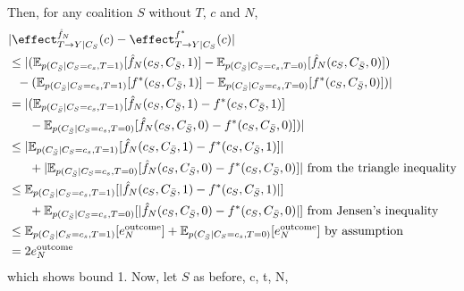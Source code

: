 Then, for any coalition $S$ without $T$, $c$ and $N$,
\begin{align*}
&| \effect^{\hat{f}_N}_{ T \rightarrow Y | C_S}(c) - \effect^{f^*}_{ T \rightarrow Y | C_S}(c)| \\
&\leq |(\mathbb{E}_{p(C_{\bar{S}}|C_S=c_s,T=1)}[\hat{f}_N(c_S,C_{\bar{S}},1)] - \mathbb{E}_{p(C_{\bar{S}}|C_S=c_s,T=0)}[\hat{f}_N(c_S,C_{\bar{S}},0)]) \\
& \ \ - (\mathbb{E}_{p(C_{\bar{S}}|C_S=c_s,T=1)}[f^*(c_S,C_{\bar{S}},1)] - \mathbb{E}_{p(C_{\bar{S}}|C_S=c_s,T=0)}[f^*(c_S,C_{\bar{S}},0)])| \\
&= |(\mathbb{E}_{p(C_{\bar{S}}|C_S=c_s,T=1)}[\hat{f}_N(c_S,C_{\bar{S}},1) - f^*(c_S,C_{\bar{S}},1)] \\
& \ \ \ \ \  - \mathbb{E}_{p(C_{\bar{S}}|C_S=c_s,T=0)}[\hat{f}_N(c_S,C_{\bar{S}},0) - f^*(c_S,C_{\bar{S}},0)])| \\
&\leq |\mathbb{E}_{p(C_{\bar{S}}|C_S=c_s,T=1)}[\hat{f}_N(c_S,C_{\bar{S}},1) - f^*(c_S,C_{\bar{S}},1)]|  \\
& \ \ \ \ \  + |\mathbb{E}_{p(C_{\bar{S}}|C_S=c_s,T=0)}[\hat{f}_N(c_S,C_{\bar{S}},0) - f^*(c_S,C_{\bar{S}},0)]| \text{ from the triangle inequality} \\
&\leq \mathbb{E}_{p(C_{\bar{S}}|C_S=c_s,T=1)}[|\hat{f}_N(c_S,C_{\bar{S}},1) - f^*(c_S,C_{\bar{S}},1)|]  \\
& \ \ \ \ \  + \mathbb{E}_{p(C_{\bar{S}}|C_S=c_s,T=0)}[|\hat{f}_N(c_S,C_{\bar{S}},0) - f^*(c_S,C_{\bar{S}},0)|] \text{ from Jensen's inequality} \\
&\leq \mathbb{E}_{p(C_{\bar{S}}|C_S=c_s,T=1)}[e^\text{outcome}_N] + \mathbb{E}_{p(C_{\bar{S}}|C_S=c_s,T=0)}[e^\text{outcome}_N] \text{ by assumption} \\
&= 2e^\text{outcome}_N
\end{align*}
which shows bound 1. Now, let $S$ as before, c, t, N,

